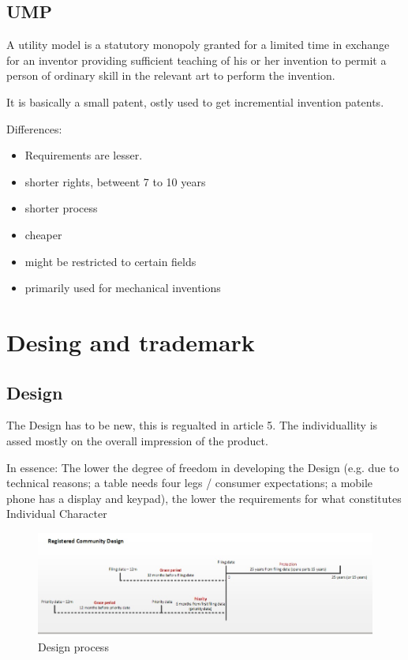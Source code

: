 \documentclass[12pt]{article} %
\begin{document}
\subsection{UMP}
A utility model is a statutory monopoly granted for a limited time in exchange for an inventor providing sufficient teaching of his or her invention to permit a person of ordinary skill in the relevant art to perform the invention. 

\par It is basically a small patent, ostly used to get incremential invention patents.

Differences:
\begin{itemize}
    \item Requirements are lesser.
    \item shorter rights, betweent 7 to 10 years
    \item shorter process
    \item cheaper
    \item might be restricted to certain fields
    \item primarily used for mechanical inventions
\end{itemize}



\section{Desing and trademark}

\subsection{Design}

The Design has to be new, this is regualted in article 5.
The individuallity is assed mostly on the overall impression of the product.

\par In essence: The lower the degree of freedom in developing the Design (e.g. due to technical reasons; a table needs four legs / consumer expectations; a mobile phone has a display and keypad), the lower the requirements for what constitutes Individual Character

\begin{figure}[H]
    \centering
    \includegraphics[width=\textwidth]{design.jpg}
    \caption{Design process}
    \label{fig:design}
\end{figure}
\end{document}

